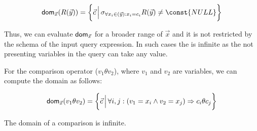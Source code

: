 \documentclass[12pt]{article}
\begin{document}

\begin{equation}
\label{def:relation}
\dom{}_{\vec x}(R(\vec y))=\bigg\{\vec c\,\Big|\,\sigma_{\forall x_i\in(\vec{y}): x_{i}=c_{i}}R(\vec y)\not= \const{NULL}\bigg\}
\end{equation}

Thus, we can evaluate $\text{\textsf{dom}}_{\vec{x}}$ for a broader range of $\vec{x}$ and it is not restricted by the schema of the input query expression. In such cases the \dom{} is infinite as the not presenting variables in the query can take any value.

For the comparison operator ($v_{1}\theta v_{2}$), where $v_1$ and $v_2$ are variables, we can compute the domain as follows:

\begin{equation}
\text{\textsf{dom}{}}_{\vec{x}}(v_{1}\theta v_{2})=\bigg\{\vec{c}\,\Big|\,\forall i,j:(v_{1}=x_{i}\land v_{2}=x_{j})\Rightarrow c_{i}\theta c_{j}\bigg\}
\end{equation}

The domain of a comparison is infinite.
\end{document}

